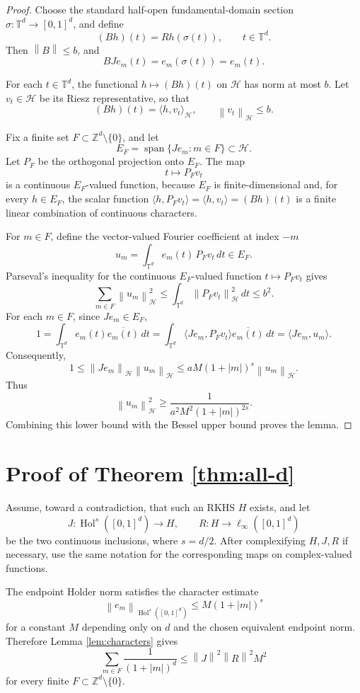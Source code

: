 \documentclass[11pt]{article}
\newcommand{\T}{\mathbb{T}}
\newcommand{\Z}{\mathbb{Z}}
\newcommand{\Hol}{\operatorname{Hol}}
\newcommand{\linf}{\ell_\infty}
\newcommand{\norm}[1]{\left\lVert #1\right\rVert}
\newcommand{\abs}[1]{\left\lvert #1\right\rvert}
\begin{document}
\begin{proof}
Choose the standard half-open fundamental-domain section
\(\sigma:\T^d\to[0,1]^d\), and define
\[
  (Bh)(t)=Rh(\sigma(t)),\qquad t\in\T^d .
\]
Then \(\norm B\le b\), and
\[
  BJe_m(t)=e_m(\sigma(t))=e_m(t).
\]

For each \(t\in\T^d\), the functional \(h\mapsto (Bh)(t)\) on \(\mathcal H\)
has norm at most \(b\). Let \(v_t\in\mathcal H\) be its Riesz representative,
so that
\[
  (Bh)(t)=\langle h,v_t\rangle_{\mathcal H},
  \qquad \norm{v_t}_{\mathcal H}\le b .
\]

Fix a finite set \(F\subset\Z^d\setminus\{0\}\), and let
\[
  E_F=\operatorname{span}\{J e_m:m\in F\}\subset\mathcal H .
\]
Let \(P_F\) be the orthogonal projection onto \(E_F\). The map
\[
  t\longmapsto P_F v_t
\]
is a continuous \(E_F\)-valued function, because \(E_F\) is finite-dimensional
and, for every \(h\in E_F\), the scalar function
\(\langle h,P_Fv_t\rangle=\langle h,v_t\rangle=(Bh)(t)\) is a finite linear
combination of continuous characters.

For \(m\in F\), define the vector-valued Fourier coefficient at index \(-m\)
\[
  u_m=\int_{\T^d}e_m(t)\,P_Fv_t\,dt\in E_F .
\]
Parseval's inequality for the continuous \(E_F\)-valued function
\(t\mapsto P_Fv_t\) gives
\[
  \sum_{m\in F}\norm{u_m}_{\mathcal H}^2
  \le \int_{\T^d}\norm{P_Fv_t}_{\mathcal H}^2\,dt
  \le b^2 .
\]
For each \(m\in F\), since \(Je_m\in E_F\),
\[
  1
  =
  \int_{\T^d}e_m(t)\overline{e_m(t)}\,dt
  =
  \int_{\T^d}\langle Je_m,P_Fv_t\rangle\overline{e_m(t)}\,dt
  =
  \langle Je_m,u_m\rangle .
\]
Consequently,
\[
  1
  \le \norm{Je_m}_{\mathcal H}\norm{u_m}_{\mathcal H}
  \le aM(1+\abs m)^s\norm{u_m}_{\mathcal H}.
\]
Thus
\[
  \norm{u_m}_{\mathcal H}^2
  \ge \frac{1}{a^2M^2(1+\abs m)^{2s}}.
\]
Combining this lower bound with the Bessel upper bound proves the lemma.
\end{proof}

\section*{Proof of Theorem \ref{thm:all-d}}

Assume, toward a contradiction, that such an RKHS \(H\) exists, and let
\[
  J:\Hol^s([0,1]^d)\to H,\qquad
  R:H\to\linf([0,1]^d)
\]
be the two continuous inclusions, where \(s=d/2\). After complexifying
\(H,J,R\) if necessary, use the same notation for the corresponding maps on
complex-valued functions.

The endpoint Holder norm satisfies the character estimate
\[
  \norm{e_m}_{\Hol^s([0,1]^d)}\le M(1+\abs m)^s
\]
for a constant \(M\) depending only on \(d\) and the chosen equivalent endpoint
norm. Therefore Lemma \ref{lem:characters} gives
\[
  \sum_{m\in F}\frac{1}{(1+\abs m)^d}\le \norm J^2\norm R^2M^2
\]
for every finite \(F\subset\Z^d\setminus\{0\}\).
\end{document}
